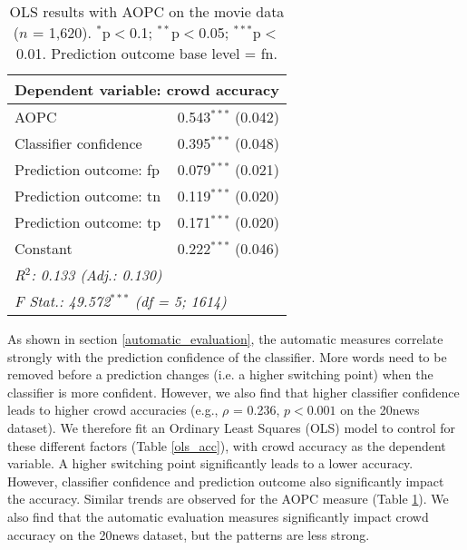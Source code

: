 \documentclass[11pt,a4paper]{article}
\begin{document}
 
 \begin{table} 
\small
\begin{tabular}{lr}
\toprule
\multicolumn{2}{c}{\textbf{Dependent variable: crowd accuracy}}\\
\midrule
  AOPC & 0.543$^{***}$ (0.042) \\ 
   Classifier confidence & 0.395$^{***}$ (0.048) \\ 
   Prediction outcome: fp & 0.079$^{***}$ (0.021) \\ 
   Prediction outcome: tn & 0.119$^{***}$ (0.020) \\ 
   Prediction outcome: tp & 0.171$^{***}$ (0.020) \\ 
   Constant & 0.222$^{***}$ (0.046) \\ 
   
   \midrule 
\multicolumn{2}{l}{\textit{R$^{2}$:  0.133 (Adj.: 0.130)}}\\
\multicolumn{2}{l}{\textit{F Stat.: 49.572$^{***}$ (df = 5; 1614)}}\\
\bottomrule\end{tabular} 
  \caption{OLS results with AOPC on the movie data ($n$ = 1,620). $^{*}$p$<$0.1; $^{**}$p$<$0.05; $^{***}$p$<$0.01. Prediction outcome base level = fn.} 

 \label{ols_acc_aopc}
\end{table}
\newpage
As shown in section \ref{automatic_evaluation}, the automatic measures correlate strongly with the prediction confidence of the classifier. More words need to be removed before a prediction changes (i.e. a higher switching point) when the classifier is more confident. However, we also find that higher 
classifier confidence leads to higher crowd accuracies (e.g., $\rho$ = 0.236, $p<0.001$ on the 20news dataset). We therefore fit an Ordinary Least Squares (OLS) model to control for these different factors (Table \ref{ols_acc}), with crowd accuracy as the dependent variable. A higher switching point significantly leads to a lower accuracy. However, classifier confidence and prediction outcome also significantly impact the accuracy.
Similar trends are observed for the AOPC measure (Table \ref{ols_acc_aopc}).
We also find that the automatic evaluation measures significantly impact crowd accuracy on the 20news dataset, but the patterns are less strong. 
\end{document}
